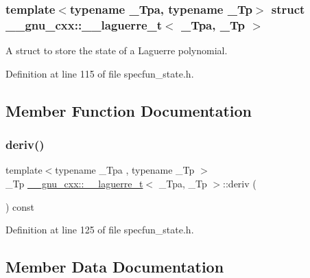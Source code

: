 \subsubsection*{template$<$typename \+\_\+\+Tpa, typename \+\_\+\+Tp$>$\newline
struct \+\_\+\+\_\+gnu\+\_\+cxx\+::\+\_\+\+\_\+laguerre\+\_\+t$<$ \+\_\+\+Tpa, \+\_\+\+Tp $>$}

A struct to store the state of a Laguerre polynomial. 

Definition at line 115 of file specfun\+\_\+state.\+h.



\subsection{Member Function Documentation}
\mbox{\label{struct____gnu__cxx_1_1____laguerre__t_aed1a4e46a049188de5ca6c2cc9bc5cdf}} 
\subsubsection{\texorpdfstring{deriv()}{deriv()}}
{\footnotesize\ttfamily template$<$typename \+\_\+\+Tpa , typename \+\_\+\+Tp $>$ \\
\+\_\+\+Tp \hyperlink{struct____gnu__cxx_1_1____laguerre__t}{\+\_\+\+\_\+gnu\+\_\+cxx\+::\+\_\+\+\_\+laguerre\+\_\+t}$<$ \+\_\+\+Tpa, \+\_\+\+Tp $>$\+::deriv (\begin{DoxyParamCaption}{ }\end{DoxyParamCaption}) const\hspace{0.3cm}{\ttfamily [inline]}}



Definition at line 125 of file specfun\+\_\+state.\+h.



\subsection{Member Data Documentation}
\mbox{\label{struct____gnu__cxx_1_1____laguerre__t_a8aa1b08deed3b739c3de21953f2c5494}} 
